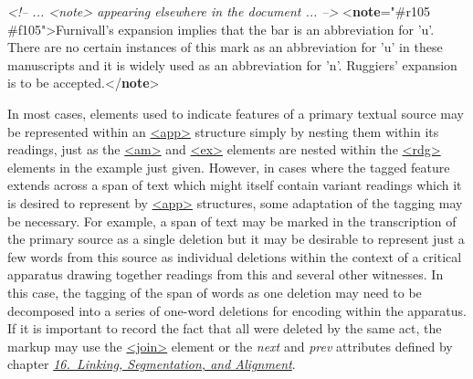 \begin{shaded}
\textit{<!-- ... <note> appearing elsewhere in the document ... -->}\mbox{}\newline 
{<\textbf{note}\hspace*{1em}{target}="{\#r105 \#f105}">}Furnivall's expansion implies that the bar\mbox{}\newline 
 is an abbreviation for 'u'. There are no certain instances of\mbox{}\newline 
 this mark as an abbreviation for 'u' in these manuscripts and it is\mbox{}\newline 
 widely used as an abbreviation for 'n'. Ruggiers' expansion is to\mbox{}\newline 
 be accepted.{</\textbf{note}>}\end{shaded}\egroup\par \par
In most cases, elements used to indicate features of a primary textual source may be represented within an \hyperref[TEI.app]{<app>} structure simply by nesting them within its readings, just as the \hyperref[TEI.am]{<am>} and \hyperref[TEI.ex]{<ex>} elements are nested within the \hyperref[TEI.rdg]{<rdg>} elements in the example just given. However, in cases where the tagged feature extends across a span of text which might itself contain variant readings which it is desired to represent by \hyperref[TEI.app]{<app>} structures, some adaptation of the tagging may be necessary. For example, a span of text may be marked in the transcription of the primary source as a single deletion but it may be desirable to represent just a few words from this source as individual deletions within the context of a critical apparatus drawing together readings from this and several other witnesses. In this case, the tagging of the span of words as one deletion may need to be decomposed into a series of one-word deletions for encoding within the apparatus. If it is important to record the fact that all were deleted by the same act, the markup may use the \hyperref[TEI.join]{<join>} element or the {\itshape next} and {\itshape prev} attributes defined by chapter \textit{\hyperref[SA]{16.\ Linking, Segmentation, and Alignment}}.
